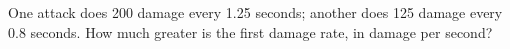 One attack does 200 damage every 1.25 seconds; another does 125 damage every 0.8 seconds. How much greater is the first damage rate, in damage per second?
